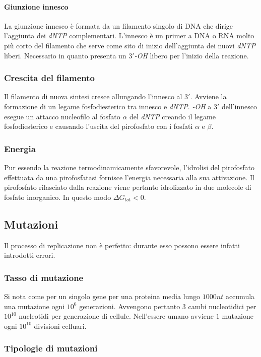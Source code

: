 			\paragraph{Giunzione innesco}
			La giunzione innesco \`e formata da un filamento singolo di DNA che dirige l'aggiunta dei \emph{dNTP} complementari.
			L'innesco \`e un primer a DNA o RNA molto pi\`u corto del filamento che serve come sito di inizio dell'aggiunta dei nuovi \emph{dNTP} liberi.
			Necessario in quanto presenta un \emph{$3'$-OH} libero per l'inizio della reazione.

		\subsubsection{Crescita del filamento}
		Il filamento di nuova sintesi cresce allungando l'innesco al $3'$.
		Avviene la formazione di un legame fosfodiesterico tra innesco e \emph{dNTP}.
		\emph{-OH} a $3'$ dell'innesco esegue un attacco nucleofilo al fosfato $\alpha$ del \emph{dNTP} creando il legame fosfodiesterico e causando l'uscita del pirofosfato con i fosfati $\alpha$ e $\beta$.

		\subsubsection{Energia}
		Pur essendo la reazione termodinamicamente sfavorevole, l'idrolisi del pirofosfato effettuata da una pirofosfatasi fornisce l'energia necessaria alla sua attivazione.
		Il pirofosfato rilasciato dalla reazione viene pertanto idrolizzato in due molecole di fosfato inorganico.
		In questo modo $\Delta G_{tot} < 0$.

	\subsection{Mutazioni}
	Il processo di replicazione non \`e perfetto: durante esso possono essere infatti introdotti errori.
	
		\subsubsection{Tasso di mutazione}
		Si nota come per un singolo gene per una proteina media lungo $1000nt$ accumula una mutazione ogni $10^6$ generazioni.
		Avvengono pertanto $3$ cambi nucleotidici per $10^{10}$ nucleotidi per generazione di cellule.
		Nell'essere umano avviene $1$ mutazione ogni $10^{10}$ divisioni celluari.

		\subsubsection{Tipologie di mutazioni}


